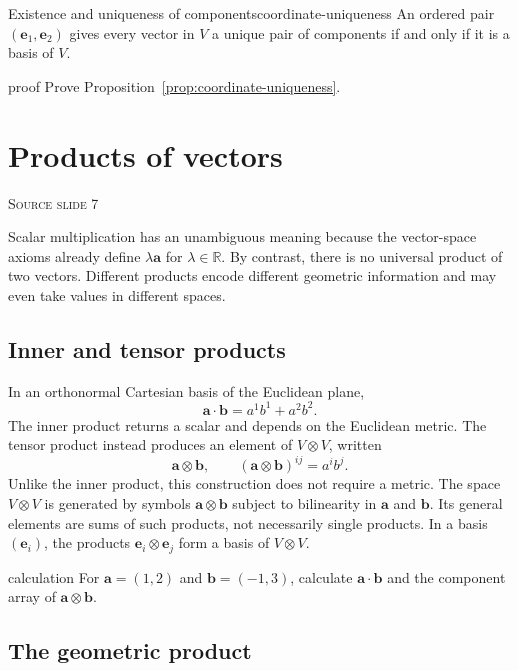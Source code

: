 \documentclass[11pt,a4paper]{article}
\newcommand{\vect}[1]{\bm{#1}}
\newcommand{\R}{\mathbb{R}}
\newcommand{\slideref}[1]{%
  \par\smallskip
  {\footnotesize\color{ink!60}\textsc{Source slide #1}}\par
}
\begin{document}
\begin{proposition}{Existence and uniqueness of components}{coordinate-uniqueness}
An ordered pair \((\vect e_1,\vect e_2)\) gives every vector in \(V\) a unique
pair of components if and only if it is a basis of \(V\).
\end{proposition}

\begin{studentwork}[height=6.2cm]{proof}
Prove Proposition~\ref{prop:coordinate-uniqueness}.
\end{studentwork}

\section{Products of vectors}
\slideref{7}

Scalar multiplication has an unambiguous meaning because the vector-space
axioms already define \(\lambda\vect a\) for \(\lambda\in\R\). By contrast, there is no universal product
of two vectors. Different products encode different geometric information and
may even take values in different spaces.

\subsection{Inner and tensor products}

In an orthonormal Cartesian basis of the Euclidean plane,
\[
  \vect{a}\cdot\vect{b}=a^1b^1+a^2b^2.
\]
The inner product returns a scalar and depends on the Euclidean metric. The
tensor product instead produces an element of \(V\otimes V\), written
\[
  \vect{a}\otimes\vect{b},
  \qquad
  (\vect{a}\otimes\vect{b})^{ij}=a^i b^j.
\]
Unlike the inner product, this construction does not require a metric.
The space \(V\otimes V\) is generated by symbols \(\vect a\otimes\vect b\)
subject to bilinearity in \(\vect a\) and \(\vect b\). Its general elements
are sums of such products, not necessarily single products. In a basis
\((\vect e_i)\), the products \(\vect e_i\otimes\vect e_j\) form a basis
of \(V\otimes V\).

\begin{studentwork}[height=4.8cm]{calculation}
For \(\vect{a}=(1,2)\) and \(\vect{b}=(-1,3)\), calculate
\(\vect{a}\cdot\vect{b}\) and the component array of
\(\vect{a}\otimes\vect{b}\).
\end{studentwork}

\subsection{The geometric product}
\end{document}
